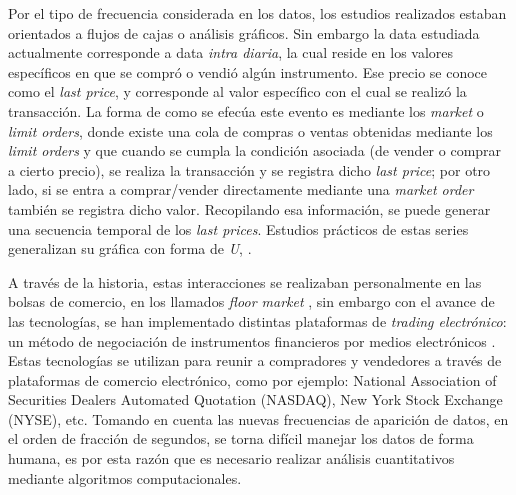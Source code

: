 Por el tipo de frecuencia considerada en los datos, los estudios realizados estaban orientados a flujos de cajas o análisis gráficos. Sin embargo la data estudiada 
actualmente corresponde a data \emph{intra diaria}, la cual reside en los valores específicos en que se compró o vendió algún instrumento. 
Ese precio se conoce como el \emph{last price}, y corresponde al valor específico con el cual se realizó la transacción. La forma de como se efecúa este evento es 
mediante los \emph{market} o \emph{limit orders}, donde existe una cola de compras o ventas obtenidas mediante los \emph{limit orders} y que cuando se cumpla la 
condición asociada (de vender o comprar a cierto precio), se realiza la transacción y se registra dicho \emph{last price}; 
por otro lado, si se entra a comprar/vender directamente mediante una \emph{market order} también se registra dicho valor. Recopilando esa información, 
se puede generar una secuencia temporal de los \emph{last prices}. Estudios prácticos de estas series generalizan su gráfica con forma de \emph{U},
\cite{biais2012empirical}. 


A través de la historia, estas interacciones se realizaban personalmente en las bolsas de comercio, en los llamados \emph{floor market} \cite{jain2005financial},
sin embargo con el avance de las tecnologías, se han implementado distintas plataformas de \emph{trading electrónico}: un método de negociación de instrumentos 
financieros por medios electrónicos \cite{weston2002electronic}. Estas tecnologías se utilizan para reunir a compradores y vendedores a través de plataformas de comercio 
electrónico, como por ejemplo: National Association of Securities Dealers Automated Quotation (NASDAQ), New York Stock Exchange (NYSE), etc. Tomando en cuenta las nuevas 
frecuencias de aparición de datos, en el orden de fracción de segundos, se torna difícil manejar los datos de forma humana, es por esta razón que es necesario realizar análisis 
cuantitativos mediante algoritmos computacionales.

